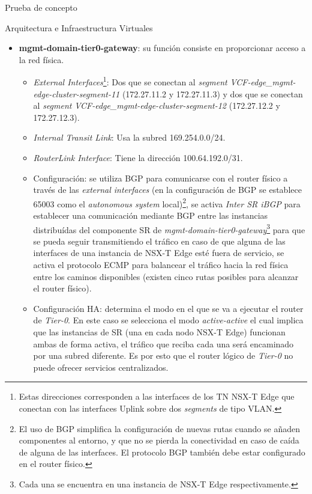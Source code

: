 \begin{section}{Prueba de concepto}
\begin{subsection}{Arquitectura e Infraestructura Virtuales\cite{CFVirtInfraes}}
\begin{itemize}
  \item \textbf{mgmt-domain-tier0-gateway}: su función consiste en proporcionar acceso a la red física.
    \begin{itemize}
      \item \textit{External Interfaces}\footnote{Estas direcciones corresponden a las interfaces de los TN NSX-T Edge que conectan con las interfaces Uplink sobre dos \textit{segments} de tipo VLAN.}: Dos que se conectan al \textit{segment} \textit{VCF-edge\_mgmt-edge-cluster-segment-11} (172.27.11.2 y 172.27.11.3) y dos que se conectan al \textit{segment} \textit{VCF-edge\_mgmt-edge-cluster-segment-12} (172.27.12.2 y 172.27.12.3).
      \item \textit{Internal Transit Link}: Usa la subred 169.254.0.0/24.
      \item \textit{RouterLink Interface}: Tiene la dirección 100.64.192.0/31.
      \item Configuración: se utiliza BGP para comunicarse con el router físico a través de las \textit{external interfaces} (en la configuración de BGP se establece 65003 como el \textit{autonomous system} local)\footnote{El uso de BGP simplifica la configuración de nuevas rutas cuando se añaden componentes al entorno, y que no se pierda la conectividad en caso de caída de alguna de las interfaces. El protocolo BGP también debe estar configurado en el router físico.}, se activa \textit{Inter SR iBGP} para establecer una comunicación mediante BGP entre las instancias distribuídas del componente SR de \textit{mgmt-domain-tier0-gateway}\footnote{Cada una se encuentra en una instancia de NSX-T Edge respectivamente.} para que se pueda seguir transmitiendo el tráfico en caso de que alguna de las interfaces de una instancia de NSX-T Edge esté fuera de servicio, se activa el protocolo ECMP para balancear el tráfico hacia la red física entre los caminos disponibles (existen cinco rutas posibles para alcanzar el router físico). 
      \item Configuración HA: determina el modo en el que se va a ejecutar el router de \textit{Tier-0}. En este caso se selecciona el modo \textit{active-active} el cual implica que las instancias de SR (una en cada nodo NSX-T Edge) funcionan ambas de forma activa, el tráfico que reciba cada una será encaminado por una subred diferente. Es por esto que el router lógico de \textit{Tier-0} no puede ofrecer servicios centralizados.
    \end{itemize}


\end{itemize}
\end{subsection}
\end{section}
